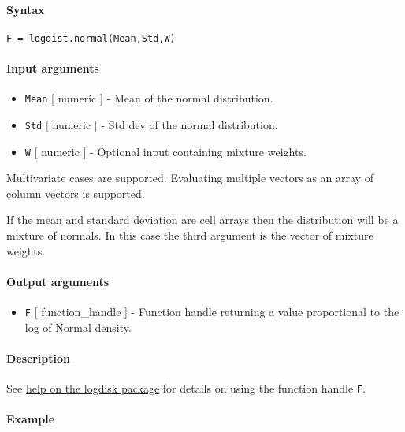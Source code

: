 


	\paragraph{Syntax}

\begin{verbatim}
F = logdist.normal(Mean,Std,W)
\end{verbatim}

\paragraph{Input arguments}

\begin{itemize}
\item
  \texttt{Mean} {[} numeric {]} - Mean of the normal distribution.
\item
  \texttt{Std} {[} numeric {]} - Std dev of the normal distribution.
\item
  \texttt{W} {[} numeric {]} - Optional input containing mixture
  weights.
\end{itemize}

Multivariate cases are supported. Evaluating multiple vectors as an
array of column vectors is supported.

If the mean and standard deviation are cell arrays then the distribution
will be a mixture of normals. In this case the third argument is the
vector of mixture weights.

\paragraph{Output arguments}

\begin{itemize}
\itemsep1pt\parskip0pt
\item
  \texttt{F} {[} function\_handle {]} - Function handle returning a
  value proportional to the log of Normal density.
\end{itemize}

\paragraph{Description}

See \href{logdist/Contents}{help on the logdisk package} for details on
using the function handle \texttt{F}.

\paragraph{Example}


